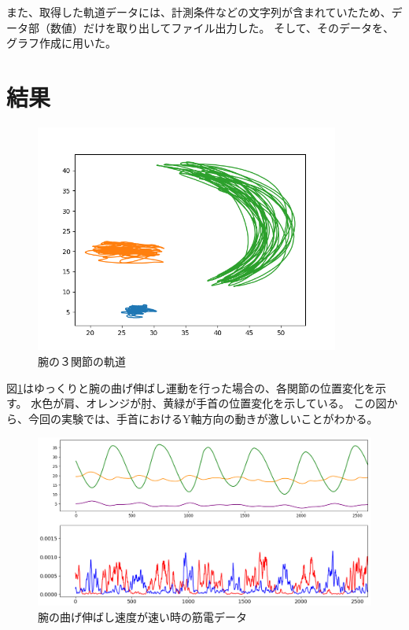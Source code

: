 \documentclass{jsarticle}
\begin{document}
また、取得した軌道データには、計測条件などの文字列が含まれていたため、データ部（数値）だけを取り出してファイル出力した。
そして、そのデータを、グラフ作成に用いた。

\clearpage
\section{結果}

\begin{figure}[h]
	\begin{center} %
		\includegraphics[width=10cm]{graph_image/slow.png}
		\caption{腕の３関節の軌道} %
		\label{kidou} %
	\end{center}
\end{figure}
図\ref{kidou}はゆっくりと腕の曲げ伸ばし運動を行った場合の、各関節の位置変化を示す。
水色が肩、オレンジが肘、黄緑が手首の位置変化を示している。
この図から、今回の実験では、手首におけるY軸方向の動きが激しいことがわかる。

\begin{figure}[!h]
	\begin{center}
		\includegraphics[width=17cm]{graph_image/fast_final.png}
		\caption{腕の曲げ伸ばし速度が速い時の筋電データ}
		\label{fast}
	\end{center}
\end{figure}
\clearpage
\end{document}
